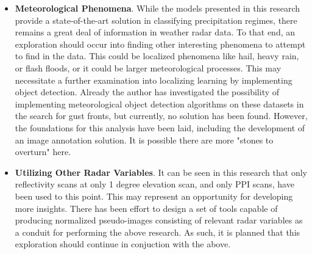 \begin{itemize}
	\item \textbf{Meteorological Phenomena}.
	While the models presented in this research provide a state-of-the-art solution in classifying precipitation regimes, there remains a great deal of information in weather radar data.
	To that end, an exploration should occur into finding other interesting phenomena to attempt to find in the data.
	This could be localized phenomena like hail, heavy rain, or flash floods, or it could be larger meteorological processes.
	This may necessitate a further examination into localizing learning by implementing object detection.
	Already the author has investigated the possibility of implementing meteorological object detection algorithms on these datasets in the search for gust fronts, but currently, no solution has been found.
	However, the foundations for this analysis have been laid, including the development of an image annotation solution.
	It is possible there are more "stones to overturn" here.
	\item \textbf{Utilizing Other Radar Variables}.
	It can be seen in this research that only reflectivity scans at only 1 degree elevation scan, and only PPI scans, have been used to this point.
	This may represent an opportunity for developing more insights.
	There has been effort to design a set of tools capable of producing normalized pseudo-images consisting of relevant radar variables as a conduit for performing the above research.
	As such, it is planned that this exploration should continue in conjuction with the above.
\end{itemize}